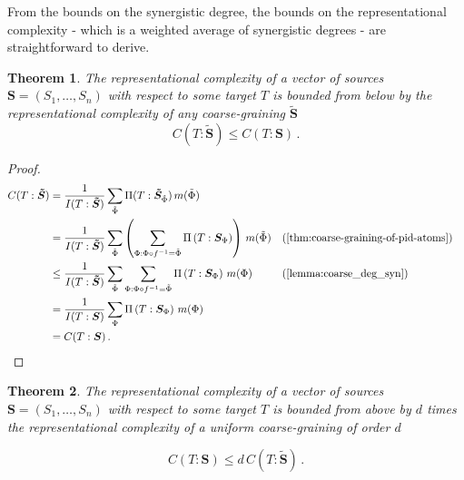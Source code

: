 \documentclass[10pt]{article}
\renewcommand\autoref[1]{\cref{#1}}
\theoremstyle{definition}
\theoremstyle{plain}
\newtheorem{theorem}{Theorem}[section]
\begin{document}
From the bounds on the synergistic degree, the bounds on the representational complexity - which is a weighted average of synergistic degrees - are straightforward to derive.

\begin{theorem}
The representational complexity of a vector of sources $\bm S = (S_1, \dots, S_n)$ with respect to some target $T$ is bounded from below by the representational complexity of any coarse-graining $\bm{\tilde{S}}$
\begin{equation}
    C(T:\bm{\tilde{S}}) \leq C(T:\bm S)\,.
\end{equation}
\end{theorem}

\begin{proof}

\begin{align*}
    C(T:\bm{\tilde{S}}) &= \frac{1}{I(T:\bm{\tilde{S}})}\sum_{\tilde{\Phi}} \Pi(T:\bm{\tilde{S}}_{\tilde{\Phi}}) \, m(\tilde{\Phi})\\
    &=\frac{1}{I(T:\bm{\tilde{S}})} \sum_{\tilde{\Phi}} \left(\sum_{\Phi:\Phi\circ f^{-1} = \tilde{\Phi}} \Pi\left(T:\bm{S}_ {\Phi}\right) \right)\, m(\tilde{\Phi}) && \text{(\autoref{thm:coarse-graining-of-pid-atoms})}\\
    &\leq \frac{1}{I(T:\bm{\tilde{S}})} \sum_{\tilde{\Phi}} \sum_{\Phi:\Phi\circ f^{-1} = \tilde{\Phi}} \Pi\left(T:\bm{S}_ {\Phi}\right) \, m(\Phi) && \text{(\autoref{lemma:coarse_deg_syn})}\\
    &=\frac{1}{I(T:\bm{S})} \sum_\Phi \Pi\left(T:\bm{S}_ {\Phi}\right) \, m(\Phi)\\
    &= C(T:\bm{S})\,.
\end{align*}

\end{proof}

\begin{theorem}
The representational complexity of a vector of sources $\bm S = (S_1, \dots, S_n)$ with respect to some target $T$ is bounded from above by $d$ times the representational complexity of a uniform coarse-graining of order $d$

\begin{equation}
    C(T: \bm S) \leq d \, C(T: \bm{\tilde{S}})\,.
\end{equation}
\end{theorem}
\end{document}
